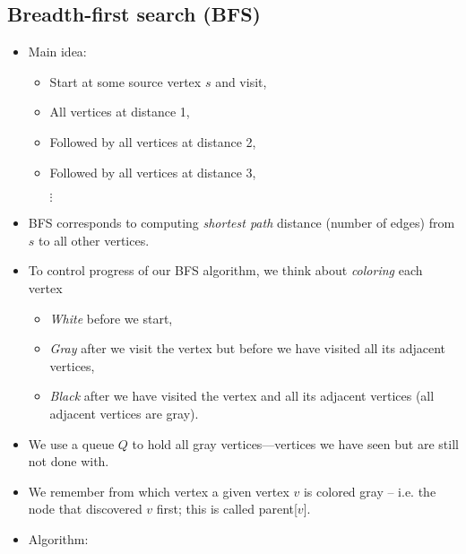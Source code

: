\subsection{Breadth-first search (BFS)}
\begin{itemize}
	\item Main idea:
	\begin{itemize}
		\item Start at some source vertex $s$ and visit,
		\item All vertices at distance 1,
		\item Followed by all vertices at distance 2,
		\item Followed by all vertices at distance 3,
		
		$\vdots$
	\end{itemize}
	\item BFS corresponds to computing {\em shortest path} distance (number of
	edges) from $s$ to all other vertices.
	\item To control progress of our BFS algorithm, we think about {\em coloring}
	each vertex
	\begin{itemize}
		\item {\em White } before we start,
		\item {\em Gray } after we visit the vertex but before we have
		visited all its adjacent vertices,
		\item {\em Black } after we have visited the vertex and all its
		adjacent vertices (all adjacent vertices are gray).
	\end{itemize}
	\item We use a queue $Q$ to hold all gray vertices---vertices we have seen
	but  are still not done with.
	\item We remember from which vertex a given vertex $v$ is colored gray
	-- i.e. the node that discovered $v$ first; this is called
	parent[$v$].
	\item Algorithm: \\ \\
\end{itemize}
